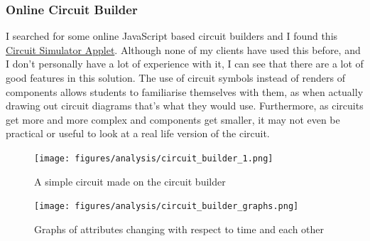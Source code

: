\documentclass[11pt]{article}
\begin{document}
            
            \subsubsection{Online Circuit Builder}
                I searched for some online JavaScript based circuit builders and I found this \href{https://www.falstad.com/circuit/}{Circuit Simulator Applet}. Although none of my clients have used this before, and I don't personally have a lot of experience with it, I can see that there are a lot of good features in this solution. The use of circuit symbols instead of renders of components allows students to familiarise themselves with them, as when actually drawing out circuit diagrams that's what they would use. Furthermore, as circuits get more and more complex and components get smaller, it may not even be practical or useful to look at a real life version of the circuit. 

                \begin{figure}[!ht]
                    \centering
                    \texttt{[image: figures/analysis/circuit\_builder\_1.png]}
                    \caption{A simple circuit made on the circuit builder}
                    \label{fig:circuit_builder_ss1}
                \end{figure}


                \begin{figure}[!ht]
                    \centering
                    \texttt{[image: figures/analysis/circuit\_builder\_graphs.png]}
                    \caption{Graphs of attributes changing with respect to time and each other}
                    \label{fig:circuit_builder_ss2}
                \end{figure}
\end{document}
